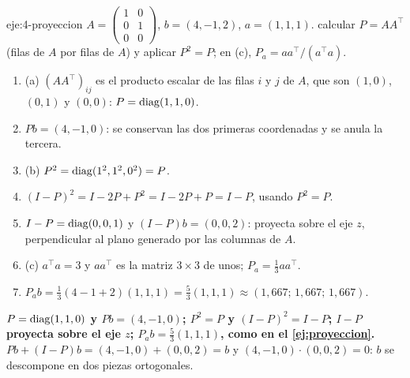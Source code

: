\begin{solucion}{eje:4-proyeccion}
\datos $A=\begin{pmatrix}1&0\\0&1\\0&0\end{pmatrix}$, $b=(4,-1,2)$, $a=(1,1,1)$.
\planteamiento calcular $P=AA^{\top}$ (filas de $A$ por filas de $A$) y aplicar $P^{2}=P$; en (c), $P_a=aa^{\top}/(a^{\top}a)$.
\pasos
\begin{enumerate}[label=\arabic*.]
  \item (a) $(AA^{\top})_{ij}$ es el producto escalar de las filas $i$ y $j$ de $A$, que son $(1,0)$, $(0,1)$ y $(0,0)$: $P=\operatorname{diag}(1,1,0)$.
  \item $Pb=(4,-1,0)$: se conservan las dos primeras coordenadas y se anula la tercera.
  \item (b) $P^{2}=\operatorname{diag}(1^{2},1^{2},0^{2})=P$.
  \item $(I-P)^{2}=I-2P+P^{2}=I-2P+P=I-P$, usando $P^{2}=P$.
  \item $I-P=\operatorname{diag}(0,0,1)$ y $(I-P)b=(0,0,2)$: proyecta sobre el eje $z$, perpendicular al plano generado por las columnas de $A$.
  \item (c) $a^{\top}a=3$ y $aa^{\top}$ es la matriz $3\times 3$ de unos; $P_a=\tfrac13 aa^{\top}$.
  \item $P_ab=\tfrac13(4-1+2)(1,1,1)=\tfrac53(1,1,1)\approx(1{,}667;\,1{,}667;\,1{,}667)$.
\end{enumerate}
\resultado \textbf{$P=\operatorname{diag}(1,1,0)$ y $Pb=(4,-1,0)$; $P^{2}=P$ y $(I-P)^{2}=I-P$; $I-P$ proyecta sobre el eje $z$; $P_ab=\tfrac53(1,1,1)$, como en el \cref{ej:proyeccion}.}
\comprobacion $Pb+(I-P)b=(4,-1,0)+(0,0,2)=b$ y $(4,-1,0)\cdot(0,0,2)=0$: $b$ se descompone en dos piezas ortogonales.
\end{solucion}

